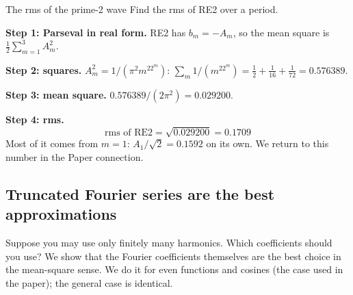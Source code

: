 \begin{sample}{The rms of the prime-2 wave}
Find the rms of RE2 over a period.

\textbf{Step 1: Parseval in real form.} RE2 has $b_m=-A_m$, so the mean square is $\frac12\sum_{m=1}^3A_m^2$.

\textbf{Step 2: squares.} $A_m^2=1/(\pi^2m^22^m)$: $\sum_m 1/(m^22^m)=\frac12+\frac1{16}+\frac1{72}=0.576389$.

\textbf{Step 3: mean square.} $0.576389/(2\pi^2)=0.029200$.

\textbf{Step 4: rms.}
\[
\boxed{\text{rms of RE2}=\sqrt{0.029200}=0.1709}
\]
Most of it comes from $m=1$: $A_1/\sqrt2=0.1592$ on its own. We return to this number in the Paper connection.
\end{sample}

\subsection{Truncated Fourier series are the best approximations}

Suppose you may use only finitely many harmonics. Which coefficients should you use? We show that the Fourier coefficients themselves are the best choice in the mean-square sense. We do it for even functions and cosines (the case used in the paper); the general case is identical.

